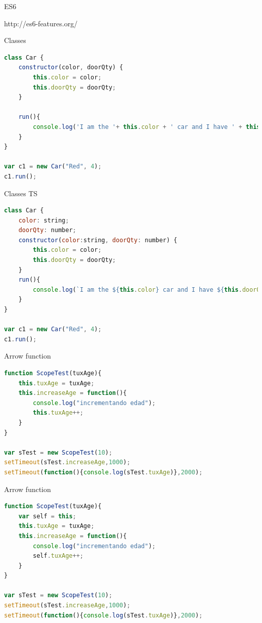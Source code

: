 \documentclass[aspectratio=169]{beamer}
\begin{document}
\begin{frame}[fragile]{ES6}

http://es6-features.org/
\end{frame}

\begin{frame}[fragile]{Classes}

\begin{lstlisting}[language=JavaScript, basicstyle=\scriptsize]
class Car {
    constructor(color, doorQty) {
        this.color = color;
        this.doorQty = doorQty;
    }

    run(){
        console.log('I am the '+ this.color + ' car and I have ' + this.doorQty + ' doors')
    }
}

var c1 = new Car("Red", 4);
c1.run();
\end{lstlisting}
\end{frame}

\begin{frame}[fragile]{Classes TS}

\begin{lstlisting}[language=JavaScript,basicstyle=\scriptsize]
class Car {
    color: string;
    doorQty: number;
    constructor(color:string, doorQty: number) {
        this.color = color;
        this.doorQty = doorQty;
    }
    run(){
        console.log(`I am the ${this.color} car and I have ${this.doorQty} doors`)
    }
}

var c1 = new Car("Red", 4);
c1.run();
\end{lstlisting}
\end{frame}

\begin{frame}[fragile]{Arrow function}

\begin{lstlisting}[language=JavaScript,basicstyle=\scriptsize]
function ScopeTest(tuxAge){
    this.tuxAge = tuxAge;
    this.increaseAge = function(){
        console.log("incrementando edad");
        this.tuxAge++;
    }
}

var sTest = new ScopeTest(10);
setTimeout(sTest.increaseAge,1000);
setTimeout(function(){console.log(sTest.tuxAge)},2000);
\end{lstlisting}
\end{frame}


\begin{frame}[fragile]{Arrow function}

\begin{lstlisting}[language=JavaScript,basicstyle=\scriptsize]
function ScopeTest(tuxAge){
    var self = this;
    this.tuxAge = tuxAge;
    this.increaseAge = function(){
        console.log("incrementando edad");
        self.tuxAge++;
    }
}

var sTest = new ScopeTest(10);
setTimeout(sTest.increaseAge,1000);
setTimeout(function(){console.log(sTest.tuxAge)},2000);
\end{lstlisting}
\end{frame}
\end{document}
